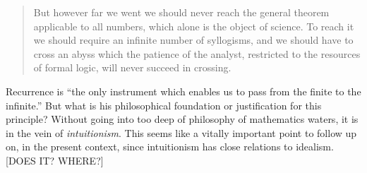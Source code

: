 \documentclass{article}
\begin{document}
\begin{quote}
    But however far we went we should never reach the general theorem applicable to all numbers, which alone is the object of science.  To reach it we should require an infinite number of syllogisms, and we should have to cross an abyss which the patience of the analyst, restricted to the resources of formal logic, will never succeed in crossing.  \citep[p. 10-11]{Poincare1952}
\end{quote}

Recurrence is ``the only instrument which enables us to pass from the finite to the infinite.''  \citep[p. 11]{Poincare1952}  But what is his  philosophical foundation or justification for this principle?  Without going into too deep of philosophy of mathematics waters, it is in the vein of \emph{intuitionism}.  This seems like a vitally important point to follow up on, in the present context, since intuitionism has close relations to idealism.  [DOES IT?  WHERE?]
\end{document}
